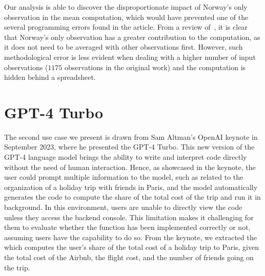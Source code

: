 Our analysis is able to discover the disproportionate impact of Norway's only observation in the mean computation, which would have prevented one of the several programming errors found in the article.
From a review of~, it is clear that Norway's only observation has a greater contribution to the computation,
as it does not need to be averaged with other observations first.
However, such methodological error is less evident when dealing with a higher number of input observations ($1175$ observations in the original work) and the computation is hidden behind a spreadsheet.



\section{GPT-4 Turbo}

The second use case we present is drawn from Sam Altman's OpenAI keynote in September 2023, where he presented the GPT-4 Turbo.
This new version of the GPT-4 language model brings the ability to write and interpret code directly without the need of human interaction.
Hence, as showcased in the keynote, the user could prompt multiple information to the model, such as related to the organization of a holiday trip with friends in Paris, and the model automatically generates the code to compute the share of the total cost of the trip and run it in background.
In this environment, users are unable to directly view the code unless they access the backend console.
This limitation makes it challenging for them to evaluate whether the function has been implemented correctly or not, assuming users have the capability to do so.
%
From the keynote, we extracted the~ which computes the user's share of the total cost of a holiday trip to Paris, given the total cost of the Airbnb, the flight cost, and the number of friends going on the trip.
%
%

